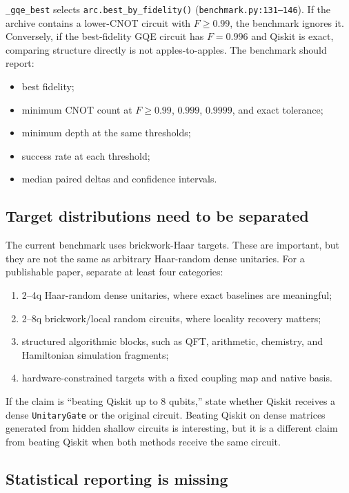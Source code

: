 \documentclass[11pt,a4paper]{article}
\begin{document}
\texttt{\_gqe\_best} selects \texttt{arc.best\_by\_fidelity()}
(\texttt{benchmark.py:131--146}). If the archive contains a lower-CNOT circuit
with $F\ge0.99$, the benchmark ignores it. Conversely, if the best-fidelity
GQE circuit has $F=0.996$ and Qiskit is exact, comparing structure directly is
not apples-to-apples. The benchmark should report:
\begin{itemize}[leftmargin=2em]
  \item best fidelity;
  \item minimum CNOT count at $F\ge0.99$, $0.999$, $0.9999$, and exact tolerance;
  \item minimum depth at the same thresholds;
  \item success rate at each threshold;
  \item median paired deltas and confidence intervals.
\end{itemize}

\subsection{Target distributions need to be separated}

The current benchmark uses brickwork-Haar targets. These are important, but
they are not the same as arbitrary Haar-random dense unitaries. For a
publishable paper, separate at least four categories:
\begin{enumerate}[leftmargin=2em]
  \item 2--4q Haar-random dense unitaries, where exact baselines are meaningful;
  \item 2--8q brickwork/local random circuits, where locality recovery matters;
  \item structured algorithmic blocks, such as QFT, arithmetic, chemistry, and
        Hamiltonian simulation fragments;
  \item hardware-constrained targets with a fixed coupling map and native basis.
\end{enumerate}
If the claim is ``beating Qiskit up to 8 qubits,'' state whether Qiskit receives
a dense \texttt{UnitaryGate} or the original circuit. Beating Qiskit on dense
matrices generated from hidden shallow circuits is interesting, but it is a
different claim from beating Qiskit when both methods receive the same circuit.

\subsection{Statistical reporting is missing}
\end{document}
